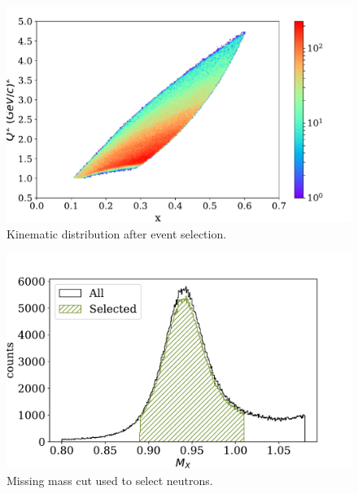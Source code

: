 \begin{figure}
  \begin{center}
    \includegraphics[width=\columnwidth]{image/x_q2.pdf}
    \caption{Kinematic distribution after event selection.}
  \end{center}
\end{figure}

\begin{figure}
  \begin{center}
    \includegraphics[width=\columnwidth]{image/missing_mass.pdf}
    \caption{Missing mass cut used to select neutrons.}
  \end{center}
\end{figure}

